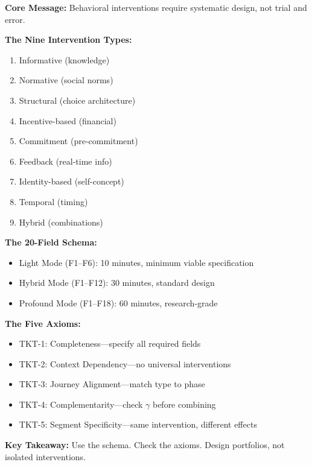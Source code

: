 \begin{tcolorbox}[colback=green!10!white, colframe=green!75!black,
    title=Chapter 17 Summary]

\textbf{Core Message:} Behavioral interventions require systematic design, not trial and error.

\textbf{The Nine Intervention Types:}
\begin{enumerate}[nosep]
\item Informative (knowledge)
\item Normative (social norms)
\item Structural (choice architecture)
\item Incentive-based (financial)
\item Commitment (pre-commitment)
\item Feedback (real-time info)
\item Identity-based (self-concept)
\item Temporal (timing)
\item Hybrid (combinations)
\end{enumerate}

\textbf{The 20-Field Schema:}
\begin{itemize}[nosep]
\item Light Mode (F1--F6): 10 minutes, minimum viable specification
\item Hybrid Mode (F1--F12): 30 minutes, standard design
\item Profound Mode (F1--F18): 60 minutes, research-grade
\end{itemize}

\textbf{The Five Axioms:}
\begin{itemize}[nosep]
\item TKT-1: Completeness---specify all required fields
\item TKT-2: Context Dependency---no universal interventions
\item TKT-3: Journey Alignment---match type to phase
\item TKT-4: Complementarity---check $\gamma$ before combining
\item TKT-5: Segment Specificity---same intervention, different effects
\end{itemize}

\textbf{Key Takeaway:} Use the schema. Check the axioms. Design portfolios, not isolated interventions.

\end{tcolorbox}



